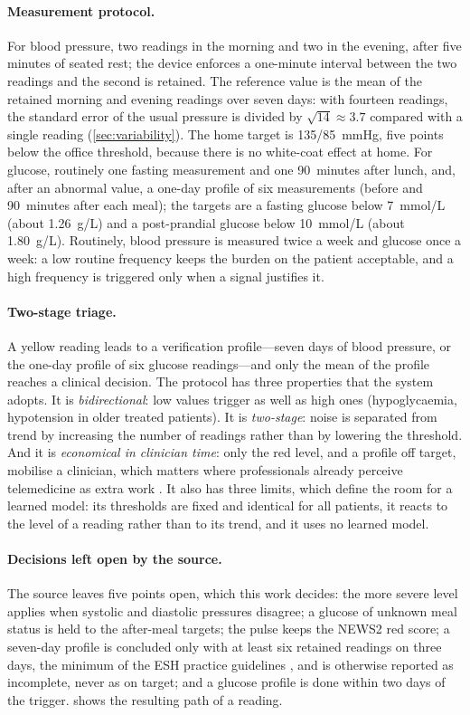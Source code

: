 \paragraph{Measurement protocol.} For blood pressure, two readings in the morning and two in the evening, after five minutes of seated rest; the device enforces a one-minute interval between the two readings and the second is retained. The reference value is the mean of the retained morning and evening readings over seven days: with fourteen readings, the standard error of the usual pressure is divided by $\sqrt{14} \approx 3.7$ compared with a single reading (\cref{sec:variability}). The home target is 135/85~mmHg, five points below the office threshold, because there is no white-coat effect at home. For glucose, routinely one fasting measurement and one 90~minutes after lunch, and, after an abnormal value, a one-day profile of six measurements (before and 90~minutes after each meal); the targets are a fasting glucose below 7~mmol/L (about 1.26~g/L) and a post-prandial glucose below 10~mmol/L (about 1.80~g/L). Routinely, blood pressure is measured twice a week and glucose once a week: a low routine frequency keeps the burden on the patient acceptable, and a high frequency is triggered only when a signal justifies it.

\paragraph{Two-stage triage.} A yellow reading leads to a verification profile---seven days of blood pressure, or the one-day profile of six glucose readings---and only the mean of the profile reaches a clinical decision. The protocol has three properties that the system adopts. It is \emph{bidirectional}: low values trigger as well as high ones (hypoglycaemia, hypotension in older treated patients). It is \emph{two-stage}: noise is separated from trend by increasing the number of readings rather than by lowering the threshold. And it is \emph{economical in clinician time}: only the red level, and a profile off target, mobilise a clinician, which matters where professionals already perceive telemedicine as extra work \parencite{dodoo2022}. It also has three limits, which define the room for a learned model: its thresholds are fixed and identical for all patients, it reacts to the level of a reading rather than to its trend, and it uses no learned model.

\paragraph{Decisions left open by the source.} The source leaves five points open, which this work decides: the more severe level applies when systolic and diastolic pressures disagree; a glucose of unknown meal status is held to the after-meal targets; the pulse keeps the NEWS2 red score; a seven-day profile is concluded only with at least six retained readings on three days, the minimum of the ESH practice guidelines \parencite{stergiou2021}, and is otherwise reported as incomplete, never as on target; and a glucose profile is done within two days of the trigger.  shows the resulting path of a reading.

